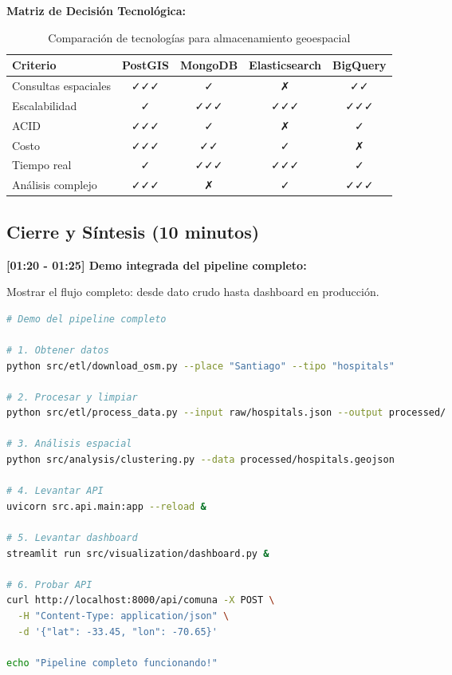 \documentclass[11pt,a4paper]{article}
\begin{document}
\textbf{Matriz de Decisión Tecnológica:}

\begin{table}[H]
\centering
\small
\begin{tabular}{|l|c|c|c|c|}
\hline
\textbf{Criterio} & \textbf{PostGIS} & \textbf{MongoDB} & \textbf{Elasticsearch} & \textbf{BigQuery} \\
\hline
Consultas espaciales & ✓✓✓ & ✓ & ✗ & ✓✓ \\
\hline
Escalabilidad & ✓ & ✓✓✓ & ✓✓✓ & ✓✓✓ \\
\hline
ACID & ✓✓✓ & ✓ & ✗ & ✓ \\
\hline
Costo & ✓✓✓ & ✓✓ & ✓ & ✗ \\
\hline
Tiempo real & ✓ & ✓✓✓ & ✓✓✓ & ✓ \\
\hline
Análisis complejo & ✓✓✓ & ✗ & ✓ & ✓✓✓ \\
\hline
\end{tabular}
\caption{Comparación de tecnologías para almacenamiento geoespacial}
\end{table}

\subsection{Cierre y Síntesis (10 minutos)}

\textbf{[01:20 - 01:25] Demo integrada del pipeline completo:}

\begin{demobox}
Mostrar el flujo completo: desde dato crudo hasta dashboard en producción.
\end{demobox}

\begin{lstlisting}[language=bash]
# Demo del pipeline completo

# 1. Obtener datos
python src/etl/download_osm.py --place "Santiago" --tipo "hospitals"

# 2. Procesar y limpiar
python src/etl/process_data.py --input raw/hospitals.json --output processed/

# 3. Análisis espacial
python src/analysis/clustering.py --data processed/hospitals.geojson

# 4. Levantar API
uvicorn src.api.main:app --reload &

# 5. Levantar dashboard
streamlit run src/visualization/dashboard.py &

# 6. Probar API
curl http://localhost:8000/api/comuna -X POST \
  -H "Content-Type: application/json" \
  -d '{"lat": -33.45, "lon": -70.65}'

echo "Pipeline completo funcionando!"
\end{lstlisting}
\end{document}
